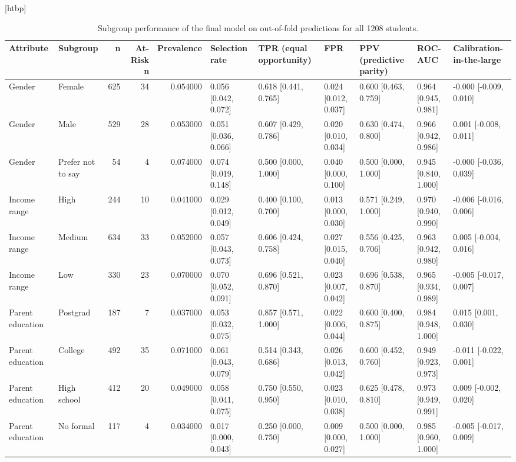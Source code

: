\begin{table}
\small[htbp]
\caption{Subgroup performance of the final model on out-of-fold predictions for all 1208 students.}
\label{tab:S22_fairness_subgroups}
\begin{tabular}{llrrrllllll}
\toprule
Attribute & Subgroup & n & At-Risk n & Prevalence & Selection rate & TPR (equal opportunity) & FPR & PPV (predictive parity) & ROC-AUC & Calibration-in-the-large \\
\midrule
Gender & Female & 625 & 34 & 0.054000 & 0.056 [0.042, 0.072] & 0.618 [0.441, 0.765] & 0.024 [0.012, 0.037] & 0.600 [0.463, 0.759] & 0.964 [0.945, 0.981] & -0.000 [-0.009, 0.010] \\
Gender & Male & 529 & 28 & 0.053000 & 0.051 [0.036, 0.066] & 0.607 [0.429, 0.786] & 0.020 [0.010, 0.034] & 0.630 [0.474, 0.800] & 0.966 [0.942, 0.986] & 0.001 [-0.008, 0.011] \\
Gender & Prefer not to say & 54 & 4 & 0.074000 & 0.074 [0.019, 0.148] & 0.500 [0.000, 1.000] & 0.040 [0.000, 0.100] & 0.500 [0.000, 1.000] & 0.945 [0.840, 1.000] & -0.000 [-0.036, 0.039] \\
Income range & High & 244 & 10 & 0.041000 & 0.029 [0.012, 0.049] & 0.400 [0.100, 0.700] & 0.013 [0.000, 0.030] & 0.571 [0.249, 1.000] & 0.970 [0.940, 0.990] & -0.006 [-0.016, 0.006] \\
Income range & Medium & 634 & 33 & 0.052000 & 0.057 [0.043, 0.073] & 0.606 [0.424, 0.758] & 0.027 [0.015, 0.040] & 0.556 [0.425, 0.706] & 0.963 [0.942, 0.980] & 0.005 [-0.004, 0.016] \\
Income range & Low & 330 & 23 & 0.070000 & 0.070 [0.052, 0.091] & 0.696 [0.521, 0.870] & 0.023 [0.007, 0.042] & 0.696 [0.538, 0.870] & 0.965 [0.934, 0.989] & -0.005 [-0.017, 0.007] \\
Parent education & Postgrad & 187 & 7 & 0.037000 & 0.053 [0.032, 0.075] & 0.857 [0.571, 1.000] & 0.022 [0.006, 0.044] & 0.600 [0.400, 0.875] & 0.984 [0.948, 1.000] & 0.015 [0.001, 0.030] \\
Parent education & College & 492 & 35 & 0.071000 & 0.061 [0.043, 0.079] & 0.514 [0.343, 0.686] & 0.026 [0.013, 0.042] & 0.600 [0.452, 0.760] & 0.949 [0.923, 0.973] & -0.011 [-0.022, 0.001] \\
Parent education & High school & 412 & 20 & 0.049000 & 0.058 [0.041, 0.075] & 0.750 [0.550, 0.950] & 0.023 [0.010, 0.038] & 0.625 [0.478, 0.810] & 0.973 [0.949, 0.991] & 0.009 [-0.002, 0.020] \\
Parent education & No formal & 117 & 4 & 0.034000 & 0.017 [0.000, 0.043] & 0.250 [0.000, 0.750] & 0.009 [0.000, 0.027] & 0.500 [0.000, 1.000] & 0.985 [0.960, 1.000] & -0.005 [-0.017, 0.009] \\
\bottomrule
\end{tabular}
\end{table}
